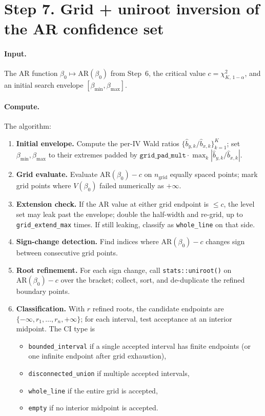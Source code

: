 \documentclass[11pt]{article}
\begin{document}
\section*{Step 7. Grid + uniroot inversion of the AR confidence set}

\paragraph{Input.} The AR function $\beta_0\mapsto\mathrm{AR}(\beta_0)$ from Step~6, the critical value $c=\chi^2_{K,\,1-\alpha}$, and an initial search envelope $[\beta_{\min},\beta_{\max}]$.

\paragraph{Compute.} The algorithm:
\begin{enumerate}[label=(\arabic*)]
\item \textbf{Initial envelope.} Compute the per-IV Wald ratios $\{\hat b_{y,k}/\hat b_{x,k}\}_{k=1}^K$; set $\beta_{\min},\beta_{\max}$ to their extremes padded by $\texttt{grid\_pad\_mult}\cdot\max_k|\hat b_{y,k}/\hat b_{x,k}|$.
\item \textbf{Grid evaluate.} Evaluate $\mathrm{AR}(\beta_0)-c$ on $n_{\mathrm{grid}}$ equally spaced points; mark grid points where $V(\beta_0)$ failed numerically as $+\infty$.
\item \textbf{Extension check.} If the AR value at either grid endpoint is $\le c$, the level set may leak past the envelope; double the half-width and re-grid, up to \texttt{grid\_extend\_max} times. If still leaking, classify as \texttt{whole\_line} on that side.
\item \textbf{Sign-change detection.} Find indices where $\mathrm{AR}(\beta_0)-c$ changes sign between consecutive grid points.
\item \textbf{Root refinement.} For each sign change, call \verb|stats::uniroot()| on $\mathrm{AR}(\beta_0)-c$ over the bracket; collect, sort, and de-duplicate the refined boundary points.
\item \textbf{Classification.} With $r$ refined roots, the candidate endpoints are $\{-\infty, r_1,\dots,r_n,+\infty\}$; for each interval, test acceptance at an interior midpoint. The CI type is
\begin{itemize}
\item \texttt{bounded\_interval} if a single accepted interval has finite endpoints (or one infinite endpoint after grid exhaustion),
\item \texttt{disconnected\_union} if multiple accepted intervals,
\item \texttt{whole\_line} if the entire grid is accepted,
\item \texttt{empty} if no interior midpoint is accepted.
\end{itemize}
\end{enumerate}
\end{document}
